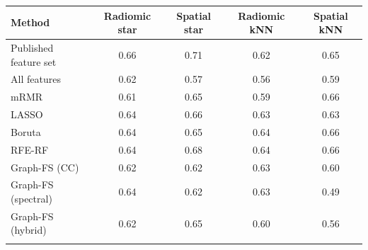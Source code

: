 \begin{tabular}{@{}lcccc@{}}
\toprule
Method & Radiomic star & Spatial star & Radiomic kNN & Spatial kNN \\
\midrule
Published feature set & 0.66 & 0.71 & 0.62 & 0.65 \\
All features & 0.62 & 0.57 & 0.56 & 0.59 \\
mRMR & 0.61 & 0.65 & 0.59 & 0.66 \\
LASSO & 0.64 & 0.66 & 0.63 & 0.63 \\
Boruta & 0.64 & 0.65 & 0.64 & 0.66 \\
RFE-RF & 0.64 & 0.68 & 0.64 & 0.66 \\
Graph-FS (CC) & 0.62 & 0.62 & 0.63 & 0.60 \\
Graph-FS (spectral) & 0.64 & 0.62 & 0.63 & 0.49 \\
Graph-FS (hybrid) & 0.62 & 0.65 & 0.60 & 0.56 \\
\botrule
\end{tabular}
